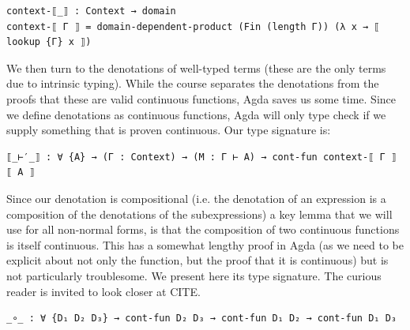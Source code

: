 \documentclass[12pt,a4paper,twoside,openright]{report}
\begin{document}
\begin{verbatim}
context-⟦_⟧ : Context → domain
context-⟦ Γ ⟧ = domain-dependent-product (Fin (length Γ)) (λ x → ⟦ lookup {Γ} x ⟧)
\end{verbatim}
We then turn to the denotations of well-typed terms (these are the only terms due to intrinsic typing). While the course separates the denotations from the proofs that these are valid continuous functions, Agda saves us some time. Since we define denotations as continuous functions, Agda will only type check if we supply something that is proven continuous. Our type signature is:
\begin{verbatim}
⟦_⊢′_⟧ : ∀ {A} → (Γ : Context) → (M : Γ ⊢ A) → cont-fun context-⟦ Γ ⟧ ⟦ A ⟧
\end{verbatim}

Since our denotation is compositional (i.e. the denotation of an expression is a composition of the denotations of the subexpressions) a key lemma that we will use for all non-normal forms, is that the composition of two continuous functions is itself continuous. This has a somewhat lengthy proof in Agda (as we need to be explicit about not only the function, but the proof that it is continuous) but is not particularly troublesome. We present here its type signature. The curious reader is invited to look closer at CITE.
\begin{verbatim}
_∘_ : ∀ {D₁ D₂ D₃} → cont-fun D₂ D₃ → cont-fun D₁ D₂ → cont-fun D₁ D₃
\end{verbatim}
\end{document}
